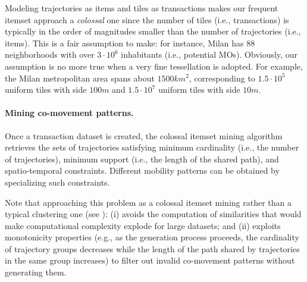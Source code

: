 \documentclass[
]{ceurart}
\begin{document}
Modeling trajectories as items and tiles as transactions makes our frequent itemset approach a \textit{colossal} one since the number of tiles (i.e., transactions) is typically in the order of magnitudes smaller than the number of trajectories (i.e., items). 
This is a fair assumption to make: for instance, Milan has 88 neighborhoods with over $3 \cdot 10^6$ inhabitants (i.e., potential MOs). 
Obviously, our assumption is no more true when a very fine tessellation is adopted.
For example, the Milan metropolitan area spans about $1500km^2$, corresponding to $1.5\cdot10^5$ uniform tiles with side $100m$ and $1.5\cdot10^7$ uniform tiles with side $10m$.

\paragraph{Mining co-movement patterns.}
Once a transaction dataset is created, the colossal itemset mining algorithm retrieves the sets of trajectories satisfying minimum cardinality (i.e., the number of trajectories), minimum support (i.e., the length of the shared path), and spatio-temporal constraints.
Different mobility patterns can be obtained by specializing such constraints.%

Note that approaching this problem as a colossal itemset mining rather than a typical clustering one (see ):
(i) avoids the computation of similarities that would make computational complexity explode for large datasets;
and (ii) exploits monotonicity properties (e.g., as the generation process proceeds, the cardinality of trajectory groups decreases while the length of the path shared by trajectories in the same group increases) to filter out invalid co-movement patterns without generating them.
\end{document}
